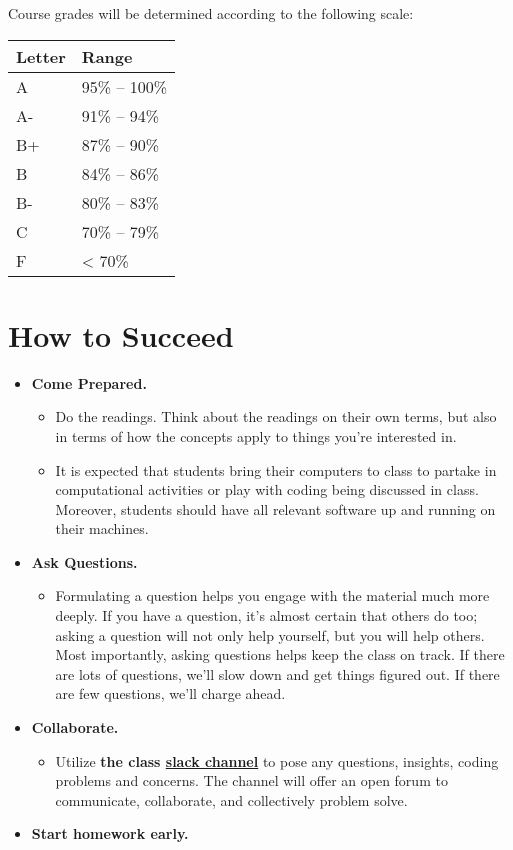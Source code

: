 \documentclass[
  12pt,
]{article}
\providecommand{\tightlist}{%
  \setlength{\itemsep}{0pt}\setlength{\parskip}{0pt}}
\begin{document}
Course grades will be determined according to the following scale:

\begin{longtable}[]{@{}ll@{}}
\toprule
Letter & Range\tabularnewline
\midrule
\endhead
A & 95\% -- 100\%\tabularnewline
A- & 91\% -- 94\%\tabularnewline
B+ & 87\% -- 90\%\tabularnewline
B & 84\% -- 86\%\tabularnewline
B- & 80\% -- 83\%\tabularnewline
C & 70\% -- 79\%\tabularnewline
F & \textless{} 70\%\tabularnewline
\bottomrule
\end{longtable}

\hypertarget{how-to-succeed}{%
\section{How to Succeed}\label{how-to-succeed}}

\begin{itemize}
\item
  \textbf{Come Prepared.}

  \begin{itemize}
  \item
    Do the readings. Think about the readings on their own terms, but
    also in terms of how the concepts apply to things you're interested
    in.
  \item
    It is expected that students bring their computers to class to
    partake in computational activities or play with coding being
    discussed in class. Moreover, students should have all relevant
    software up and running on their machines.
  \end{itemize}
\item
  \textbf{Ask Questions.}

  \begin{itemize}
  \tightlist
  \item
    Formulating a question helps you engage with the material much more
    deeply. If you have a question, it's almost certain that others do
    too; asking a question will not only help yourself, but you will
    help others. Most importantly, asking questions helps keep the class
    on track. If there are lots of questions, we'll slow down and get
    things figured out. If there are few questions, we'll charge ahead.
  \end{itemize}
\item
  \textbf{Collaborate.}

  \begin{itemize}
  \tightlist
  \item
    Utilize \textbf{the class
    \href{ppol670introt-5qu2508.slack.com}{slack channel}} to pose any
    questions, insights, coding problems and concerns. The channel will
    offer an open forum to communicate, collaborate, and collectively
    problem solve.
  \end{itemize}
\item
  \textbf{Start homework early.}


\end{itemize}
\end{document}
